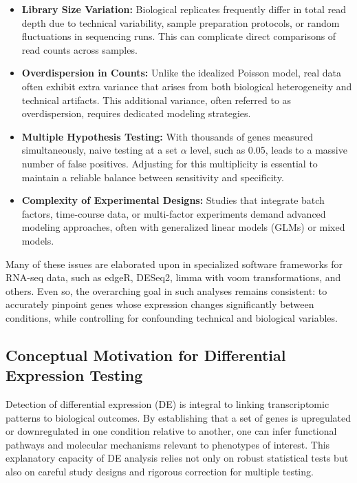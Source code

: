 \documentclass[12pt]{article}
\begin{document}
\begin{itemize}
    \item \textbf{Library Size Variation:} Biological replicates frequently differ in total read depth due to technical variability, sample preparation protocols, or random fluctuations in sequencing runs. This can complicate direct comparisons of read counts across samples.
    \item \textbf{Overdispersion in Counts:} Unlike the idealized Poisson model, real data often exhibit extra variance that arises from both biological heterogeneity and technical artifacts. This additional variance, often referred to as overdispersion, requires dedicated modeling strategies.
    \item \textbf{Multiple Hypothesis Testing:} With thousands of genes measured simultaneously, naive testing at a set $\alpha$ level, such as 0.05, leads to a massive number of false positives. Adjusting for this multiplicity is essential to maintain a reliable balance between sensitivity and specificity.
    \item \textbf{Complexity of Experimental Designs:} Studies that integrate batch factors, time-course data, or multi-factor experiments demand advanced modeling approaches, often with generalized linear models (GLMs) or mixed models.
\end{itemize}

Many of these issues are elaborated upon in specialized software frameworks for RNA-seq data, such as edgeR, DESeq2, limma with voom transformations, and others. Even so, the overarching goal in such analyses remains consistent: to accurately pinpoint genes whose expression changes significantly between conditions, while controlling for confounding technical and biological variables.

\subsection{Conceptual Motivation for Differential Expression Testing}
Detection of differential expression (DE) is integral to linking transcriptomic patterns to biological outcomes. By establishing that a set of genes is upregulated or downregulated in one condition relative to another, one can infer functional pathways and molecular mechanisms relevant to phenotypes of interest. This explanatory capacity of DE analysis relies not only on robust statistical tests but also on careful study designs and rigorous correction for multiple testing.
\end{document}
